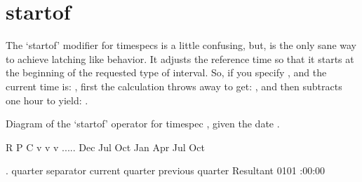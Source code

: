 \documentclass[letterpaper,10pt,english]{sphinxmanual}
\begin{document}
\section{startof}
\label{\detokenize{mariadb-parted:startof}}
\sphinxAtStartPar
The ‘startof’ modifier for timespecs is a little confusing,
but, is the only sane way to achieve latching like behavior.
It adjusts the reference time so that it starts at the beginning
of the requested type of interval. So, if you specify ,
and the current time is: , first the calculation
throws away  to get: , and then subtracts
one hour to yield: .

\sphinxAtStartPar
Diagram of the ‘startof’ operator for timespec ,
given the date .

\begin{sphinxVerbatim}[commandchars=\\\{\}]
        R P   C
        v v   v
 \PYGZhy{}\PYGZhy{}\PYGZhy{}.\PYGZhy{}\PYGZhy{}\PYGZhy{}.\PYGZhy{}\PYGZhy{}\PYGZhy{}.\PYGZhy{}\PYGZhy{}\PYGZhy{}.\PYGZhy{}\PYGZhy{}\PYGZhy{}.\PYGZhy{}\PYGZhy{}\PYGZhy{} Dec 
 \PYGZca{}   \PYGZca{}   \PYGZca{}   \PYGZca{}   \PYGZca{}   \PYGZca{}
 Jul Oct Jan Apr Jul Oct
    

.  quarter separator
  current quarter
  previous quarter
  Resultant  \PYGZhy{}01\PYGZhy{}01 :00:00
\end{sphinxVerbatim}
\end{document}
